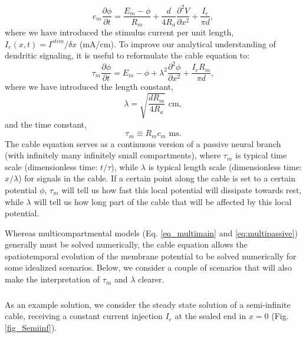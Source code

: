 \begin{equation}
c_m \frac{\partial \phi}{\partial t} = \frac{E_m-\phi}{R_m} +  \frac{d}{4 R_a}  \frac{\partial^2 V}{\partial x^2}  + \frac{I_e}{\pi d},
\label{eq:cable}
\end{equation}
where we have introduced the stimulus current per unit length, $I_e(x,t) = I^{stim}/\delta x$ (mA/cm). To improve our analytical understanding of dendritic signaling, it is useful to reformulate the cable equation to:
\begin{equation}
\tau_m \frac{\partial \phi}{\partial t} = E_m-\phi +   \lambda^2  \frac{\partial^2 \phi}{\partial x^2}  + \frac{I_e R_m}{\pi d},
\label{eq:cable2}
\end{equation}
where we have introduced the length constant,
\begin{equation}
\lambda = \sqrt{\frac{d R_m}{4 R_a}} \,\, \text{cm}, 
\label{eq:lengthconst}
\end{equation}
and the time constant, 
\begin{equation}
\tau_m \equiv R_m c_m  \,\, \text{ms}.
\label{eq:timeconst}
\end{equation}
The cable equation serves as a continuous version of a passive neural branch (with infinitely many infinitely small compartments), 
where $\tau_m$ is typical time scale (dimensionless time: $t/\tau$), while $\lambda$  is typical length scale  (dimensionless time: $x/\lambda$) for signals in the cable. If a certain point along the cable is set to a certain potential $\phi$, $\tau_m$ will tell us how fast this local potential will dissipate towards rest, while $\lambda$ will tell us how long part of the cable that will be affected by this local potential. 

Whereas multicompartmental models (Eq. \ref{eq_multimain} and \ref{eq:multipassive}) generally must be solved numerically, the cable equation allows the spatiotemporal evolution of the membrane potential to be solved numerically for some idealized scenarios. Below, we consider a couple of scenarios that will also make the interpretation of $\tau_m$ and $\lambda$ clearer. 


\subsubsection{}
As an example solution, we consider the steady state solution of a semi-infinite cable, receiving a constant current injection $I_e$ at the sealed end in $x=0$ (Fig. \ref{fig_Semiinf}).


